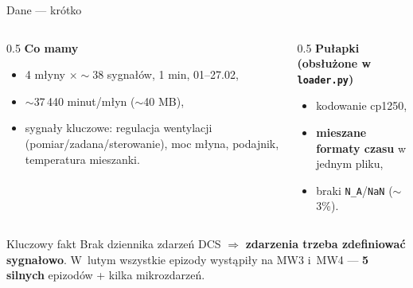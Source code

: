 \documentclass[aspectratio=169,11pt]{beamer}
\newcommand{\sig}[1]{\textcolor{akcent}{\textbf{#1}}}
\begin{document}
\begin{frame}{Dane --- krótko}
  \begin{columns}[T]
    \begin{column}{0.5\textwidth}
      \textbf{Co mamy}
      \begin{itemize}\footnotesize
        \item 4 młyny $\times \sim$38 sygnałów, 1 min, 01--27.02,
        \item $\sim$37\,440 minut/młyn ($\sim$40 MB),
        \item sygnały kluczowe: regulacja wentylacji (pomiar/zadana/sterowanie), moc młyna, podajnik, temperatura mieszanki.
      \end{itemize}
    \end{column}
    \begin{column}{0.5\textwidth}
      \textbf{Pułapki (obsłużone w \texttt{loader.py})}
      \begin{itemize}\footnotesize
        \item kodowanie cp1250,
        \item \sig{mieszane formaty czasu} w jednym pliku,
        \item braki \texttt{N\_A}/\texttt{NaN} ($\sim$3\%).
      \end{itemize}
    \end{column}
  \end{columns}
  \vspace{0.6em}
  \begin{block}{Kluczowy fakt}
    \footnotesize Brak dziennika zdarzeń DCS $\Rightarrow$ \sig{zdarzenia trzeba zdefiniować sygnałowo}.
    W~lutym wszystkie epizody wystąpiły na MW3 i~MW4 --- \textbf{5 silnych} epizodów + kilka mikrozdarzeń.
  \end{block}
\end{frame}
\end{document}
